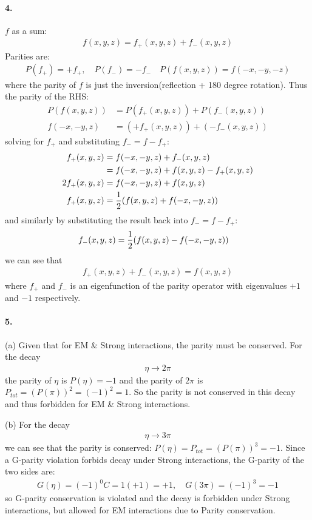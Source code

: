 \documentclass[../main.tex]{subfiles}
\begin{document}
\paragraph*{4.} $f$ as a sum:
\begin{align*}
    f(x, y, z) = f_+(x, y, z) + f_-(x, y, z)
\end{align*}
Parities are:
\begin{align*}
    P(f_+) = + f_+, \quad P(f_-) = -f_- \quad P(f(x,y,z)) = f(-x,-y,-z)
\end{align*}
where the parity of $f$ is just the inversion(reflection + 180 degree rotation). Thus the parity of
the RHS:
\begin{align*}
    P(f(x,y,z)) &= P(f_+(x,y,z)) + P(f_-(x,y,z)) \\
    f(-x,-y,z) &= (+f_+(x,y,z)) + (-f_-(x,y,z))
\end{align*}
solving for $f_+$ and substituting $f_- = f - f_+$:
\begin{align*}
    f_+(x,y,z) &= f(-x,-y,z) + f_-(x,y,z) \\
    &= f(-x,-y,z) + f(x,y,z) - f_+(x,y,z) \\
    2f_+(x,y,z) &= f(-x,-y,z) + f(x,y,z) \\
    f_+(x,y,z) &= \frac{1}{2} \qt(f(x,y,z) + f(-x,-y,z))
\end{align*}
and similarly by substituting the result back into $f_- = f - f_+$:
\begin{align*}
    f_-(x,y,z) &= \frac{1}{2} \qt(f(x,y,z) - f(-x,-y,z))
\end{align*}
we can see that
\begin{align*}
    f_+(x,y,z) + f_-(x,y,z) = f(x,y,z)
\end{align*}
where $f_+$ and $f_-$ is an eigenfunction of the parity operator with eigenvalues $+ 1$ and $-1$
respectively.

\paragraph*{5.} (a) Given  that for EM \& Strong interactions, the parity must be conserved. For the
decay
\begin{align*}
    \eta \to 2\pi
\end{align*}
the parity of $\eta$ is $P(\eta) = -1$ and the parity of $2\pi$ is $P_{tot} = (P(\pi))^2 = (-1)^2 = 1$.
So the parity is not conserved in this decay and thus forbidden for EM \& Strong interactions. 

(b) For the decay
\begin{align*}
    \eta \to 3\pi
\end{align*}
we can see that the parity is conserved: $P(\eta) = P_{tot} = (P(\pi))^3 = -1$. Since a G-parity 
violation forbids decay under Strong interactions, the G-parity of the two sides are:
\begin{align*}
    G(\eta) = (-1)^0 C = 1(+1) = +1, \quad G(3\pi) = (-1)^3 = -1
\end{align*}
so G-parity conservation is violated and the decay is forbidden under Strong interactions, but
allowed for EM interactions due  to Parity conservation.
\end{document}
